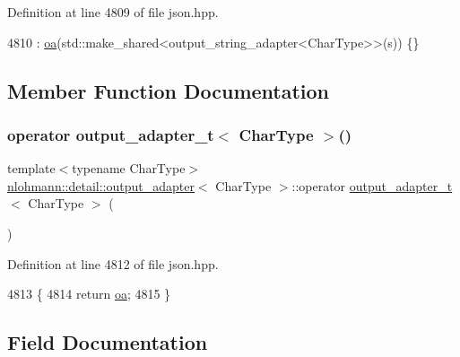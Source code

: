 Definition at line 4809 of file json.\+hpp.


\begin{DoxyCode}
4810         : \hyperlink{classnlohmann_1_1detail_1_1output__adapter_a91f4b157cc22524555a5dce16aa56278}{oa}(std::make\_shared<output\_string\_adapter<CharType>>(s)) \{\}
\end{DoxyCode}


\subsection{Member Function Documentation}
\mbox{\label{classnlohmann_1_1detail_1_1output__adapter_adee7a0e124f483d9945b8b85c73d7957}} 
\subsubsection{\texorpdfstring{operator output\+\_\+adapter\+\_\+t$<$ Char\+Type $>$()}{operator output\_adapter\_t< CharType >()}}
{\footnotesize\ttfamily template$<$typename Char\+Type$>$ \\
\hyperlink{classnlohmann_1_1detail_1_1output__adapter}{nlohmann\+::detail\+::output\+\_\+adapter}$<$ Char\+Type $>$\+::operator \hyperlink{namespacenlohmann_1_1detail_a9b680ddfb58f27eb53a67229447fc556}{output\+\_\+adapter\+\_\+t}$<$ Char\+Type $>$ (\begin{DoxyParamCaption}{ }\end{DoxyParamCaption})\hspace{0.3cm}{\ttfamily [inline]}}



Definition at line 4812 of file json.\+hpp.


\begin{DoxyCode}
4813     \{
4814         \textcolor{keywordflow}{return} \hyperlink{classnlohmann_1_1detail_1_1output__adapter_a91f4b157cc22524555a5dce16aa56278}{oa};
4815     \}
\end{DoxyCode}


\subsection{Field Documentation}
\mbox{\label{classnlohmann_1_1detail_1_1output__adapter_a91f4b157cc22524555a5dce16aa56278}} 

